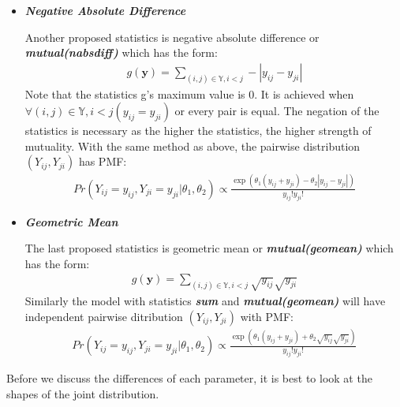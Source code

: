\documentclass[12pt,a4paper,twoside,openany]{book}
\begin{document}
\begin{itemize}
\item \textit{\textbf{Negative Absolute Difference}}

Another proposed statistics is negative absolute difference or \textit{\textbf{mutual(nabsdiff)}} which has the form:
\begin{align}
g(\bm{y}) = \sum_{(i,j)\in\mathbb{Y},i<j} -|y_{ij} - y_{ji}| 
\end{align}
Note that the statistics g's maximum value is 0. 
It is achieved when $\forall(i,j) \in\mathbb{Y},i<j (y_{ij}=y_{ji})$ or every pair is equal. 
The negation of the statistics is necessary as the higher the statistics, the higher strength of mutuality. 
With the same method as above, the pairwise distribution $(Y_{ij},Y_{ji})$ has PMF:
\begin{align*}
Pr(Y_{ij}=y_{ij},Y_{ji}=y_{ji}| \theta_1,\theta_2) \propto \frac{\exp(\theta_1 (y_{ij}+y_{ji}) - \theta_2 |y_{ij}-y_{ji}|)}{y_{ij}!y_{ji}!} 
\end{align*}

\item \textit{\textbf{Geometric Mean}}

The last proposed statistics is geometric mean or \textit{\textbf{mutual(geomean)}} which has the form:
\begin{align}
g(\bm{y}) = \sum_{(i,j)\in\mathbb{Y},i<j} \sqrt{y_{ij}}\sqrt{y_{ji}} 
\end{align}
Similarly the model with statistics \textit{\textbf{sum}} and \textit{\textbf{mutual(geomean)}} will have independent pairwise ditribution $(Y_{ij},Y_{ji})$ with PMF:
\begin{align*}
Pr(Y_{ij}=y_{ij},Y_{ji}=y_{ji}| \theta_1,\theta_2) \propto \frac{\exp(\theta_1 (y_{ij}+y_{ji}) + \theta_2 \sqrt{y_{ij}}\sqrt{y_{ji}})}{y_{ij}!y_{ji}!} 
\end{align*}
\end{itemize}
Before we discuss the differences of each parameter, it is best to look at the  shapes of the joint distribution. 
\end{document}
